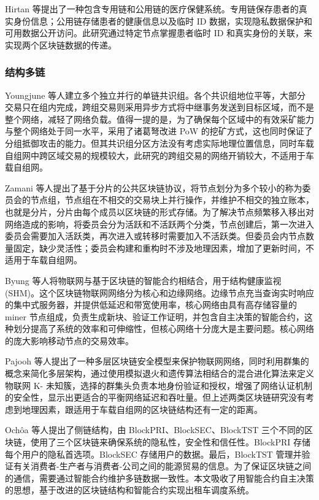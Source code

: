 Hirtan 等提出了一种包含专用链和公用链的医疗保健系统。专用链保存患者的真实身份信息；公用链存储患者的健康信息以及临时 ID 数据，实现隐私数据保护和可用数据公开访问。此研究通过特定节点掌握患者临时 ID 和真实身份的关联，来实现两个区块链数据的传递。

\subsubsection{结构多链}
Youngjune 等人建立多个独立并行的单链共识组。各个共识组地位平等，大部分交易只在组内完成，跨组交易则采用异步方式将中继事务发送到目标区域，而不是整个网络，减轻了网络负载。值得一提的是，为了确保每个区域中的有效采矿能力与整个网络处于同一水平，采用了诸葛弩改进 PoW 的挖矿方式，这也同时保证了分组抵御攻击的能力。但其共识组分区方法没有考虑实际地理位置信息，同时车载自组网中跨区域交易的规模较大，此研究的跨组交易的网络开销较大，不适用于车载自组网。

Zamani 等人提出了基于分片的公共区块链协议，将节点划分为多个较小的称为委员会的节点组，节点组在不相交的交易块上并行操作，并维护不相交的独立账本，也就是分片，分片由每个成员以区块链的形式存储。为了解决节点频繁移入移出对网络造成的影响，将委员会分为活跃和不活跃两个分类，节点创建后，第一次进入委员会需要加入活跃类，再次进入或转移时需要加入不活跃类。但委员会内节点数量固定，缺少灵活性；委员会构建和重构时不涉及地理因素，增加了更新时间，不适用于车载自组网。

Byung 等人将物联网与基于区块链的智能合约相结合，用于结构健康监视 (SHM)。这个区块链物联网网络分为核心和边缘网络。边缘节点充当查询实时响应的集中式服务器，并提供低延迟和带宽使用率，核心网络由具有高存储容量的miner 节点组成，负责生成新块、验证工作证明，并包含自主决策的智能合约，这种划分提高了系统的效率和可伸缩性，但核心网络十分庞大是主要问题。核心网络的庞大影响移动节点的交易效率。

Pajooh 等人提出了一种多层区块链安全模型来保护物联网网络，同时利用群集的概念来简化多层架构，通过使用模拟退火和遗传算法相结合的混合进化算法来定义物联网 K- 未知簇，选择的群集头负责本地身份验证和授权，增强了网络认证机制的安全性，显示出更适合的平衡网络延迟和吞吐量。但上述两类区块链研究没有考虑到地理因素，跟适用于车载自组网的区块链结构还有一定的距离。

Ochôa 等人提出了侧链结构，由 BlockPRI、BlockSEC、BlockTST 三个不同的区块链，使用了三个区块链来确保系统的隐私性，安全性和信任性。BlockPRI 存储每个用户的隐私首选项。BlockSEC 存储用户的数据。最后，BlockTST 管理并验证有关消费者-生产者与消费者-公司之间的能源贸易的信息。为了保证区块链之间的通信，需要通过智能合约维护多链数据一致性。本文吸收了用智能合约自主决策的思想，基于改进的区块链结构和智能合约实现出租车调度系统。
